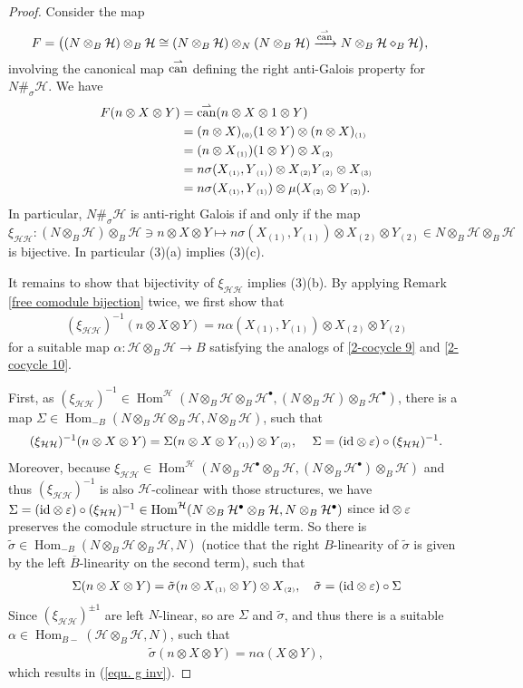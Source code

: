 \documentclass[a4paper,reqno]{amsart}
\DeclareMathOperator{\Hom}{Hom}
\newcommand*{\id}{\textup{id}}
\numberwithin{equation}{section}
\theoremstyle{plain}
\theoremstyle{remark}
\numberwithin{equation}{section}
\newcommand\inv{^{-1}}
\newcommand{\ot}{\otimes}
\newcommand{\BB}{\overline{B}}
\newcommand{\rcan}{\overset\rightharpoonup\can}
\newcommand{\z}{{}_{\scriptscriptstyle{(0)}}}
\renewcommand{\o}{{}_{\scriptscriptstyle{(1)}}}
\renewcommand{\t}{{}_{\scriptscriptstyle{(2)}}}
\renewcommand{\th}{{}_{\scriptscriptstyle{(3)}}}
\newcommand\ou[1]{\otimes_{#1}}
\newcommand{\CH}{\mathcal{H}}
\newcommand{\can}{{\rm can}}
\begin{document}
\begin{proof}
    Consider the map
    \begin{align*}
        F&=\bigl((N\ot_B\CH)\ot_B\CH\cong (N\ot_B\CH)\ot_N(N\ot_B\CH)\xrightarrow{\rcan}N\ot_B\CH\diamond_B\CH\bigr),
    \end{align*}
    involving the canonical map $\rcan$ defining the right anti-Galois property for $N\#_\sigma\CH.$ 
    We have 
    \begin{align*}
    F(n\ot X\ot Y)&=\rcan(n\ot X\ot 1\ot Y)\\
    &=(n\ot X)\z(1\ot Y)\ot (n\ot X)\o\\
    &=(n\ot X\o)(1\ot Y)\ot X\t\\
    &=n\sigma(X\o,Y\o)\ot X\t Y\t\ot X\th\\
    &=n\sigma(X\o,Y\o)\ot \mu(X\t\ot Y\t).
    \end{align*}
    In particular, $N\#_{\sigma}\CH$ is anti-right Galois if and only if the map 
    \[\xi_{\CH\CH}\colon (N\ou B\CH)\ou B\CH\ni n\ot X\ot Y\mapsto n\sigma(X\o,Y\o)\ot X\t\ot Y\t\in N\ou B\CH\ou B\CH\]
    is bijective. In particular (3)(a) implies (3)(c). 
    
    It remains to show that bijectivity of $\xi_{\CH\CH}$ implies (3)(b). By applying Remark \ref{free comodule bijection} twice, we first show that
 \begin{align}\label{equ. g inv}
     (\xi_{\CH\CH})\inv(n\ot X\ot Y)=n\alpha(X\o,Y\o)\ot X\t\ot Y\t
 \end{align}
 for a suitable map $\alpha\colon \CH\ou B\CH\to B$ satisfying the analogs of \eqref{2-cocycle 9} and \eqref{2-cocycle 10}.
 
     First,  as $(\xi_{\CH\CH})^{-1}\in \Hom^{\CH}(N\ot_B\CH\ot_B\CH^{\bullet}, (N\ot_B\CH)\ot_B\CH^{\bullet})$, there is a map $\Sigma\in \Hom_{-B}(N\ot_B\CH\ot_B\CH, N\ot_B\CH)$, such that \begin{align*}
        (\xi_{\CH\CH})^{-1}(n\ot X\ot Y)=\Sigma(n\ot X\ot Y\o)\ot Y\t,\,\quad \Sigma=(\id\ot \varepsilon)\circ (\xi_{\CH\CH})^{-1}.
    \end{align*}
Moreover, because $\xi_{\CH\CH}\in \Hom^{\CH}(N\ot_B\CH^{\bullet}\ot_B\CH, (N\ot_B\CH^{\bullet})\ot_B\CH)$ and thus $(\xi_{\CH\CH})\inv$ is also $\CH$-colinear with those structures,  we have $\Sigma=(\id\ot \varepsilon)\circ (\xi_{\CH\CH})^{-1}\in \Hom^{\CH}(N\ot_B\CH^{\bullet}\ot_B\CH, N\ot_B\CH^{\bullet})$ since $\id\ot \varepsilon$ preserves the comodule structure in the middle term. So there is $\tilde{\sigma}\in \Hom_{-B}(N\ot_{B}\CH\ot_B\CH, N)$ (notice that the right $B$-linearity of $\tilde{\sigma}$ is given by the left $\BB$-linearity on the second term), such that
\begin{align*}
    \Sigma(n\ot X\ot Y)=\tilde{\sigma}(n\ot X\o\ot Y)\ot X\t,\quad \tilde{\sigma}=(\id\ot \varepsilon)\circ \Sigma
\end{align*}
Since $(\xi_{\CH\CH})^{\pm 1}$ are left $N$-linear, so are $\Sigma$ and $\tilde{\sigma}$, and thus there is a suitable $\alpha\in \Hom_{B-}(\CH\ot_B\CH, N)$, such that
\begin{align*}
    \tilde{\sigma}(n\ot X\ot Y)=n\alpha(X\ot Y),
\end{align*}
which results in (\ref{equ. g inv}).


\end{proof}
\end{document}
